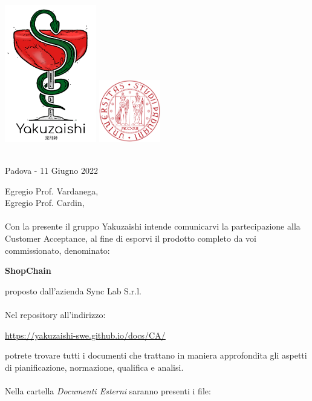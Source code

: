 \documentclass[a4paper, 10pt]{article}
\begin{document}
\begin{center}
\includegraphics[width=0.3\textwidth]{../template/images/logo.png}
\hspace{3cm}
\includegraphics[width=0.2\textwidth]{../template/images/logoUnipd.png}\\
\end{center}
\begin{flushright}
    \
    \textbf{}\\
    Padova - 11 Giugno 2022
\end{flushright}
Egregio Prof. Vardanega,\\
Egregio Prof. Cardin,\\\\
Con la presente il gruppo Yakuzaishi intende comunicarvi la partecipazione alla Customer Acceptance, al fine di esporvi il prodotto completo da voi commissionato, denominato:
\begin{center}
    \textbf{ShopChain}
\end{center}
proposto dall'azienda Sync Lab S.r.l.\\\\
Nel repository all'indirizzo:
\begin{center}
    \href{https://yakuzaishi-swe.github.io/docs/CA/}{\underline{https://yakuzaishi-swe.github.io/docs/CA/}}\\ 
\end{center}
potrete trovare tutti i documenti che trattano in maniera approfondita gli aspetti di pianificazione, normazione, qualifica e analisi.\\\\
Nella cartella \textit{Documenti Esterni} saranno presenti i file:
\end{document}
